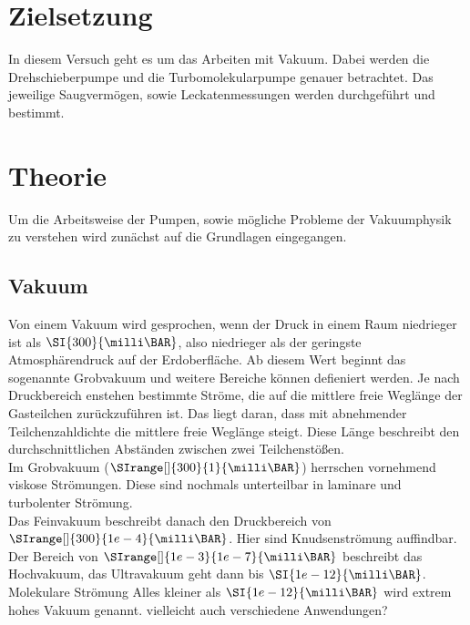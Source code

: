 \section{Zielsetzung}
    In diesem Versuch geht es um das Arbeiten mit Vakuum.
    Dabei werden die Drehschieberpumpe und die Turbomolekularpumpe genauer betrachtet.
    Das jeweilige Saugvermögen, sowie Leckatenmessungen werden durchgeführt und bestimmt.

\section{Theorie}
\label{sec:Theorie}
    Um die Arbeitsweise der Pumpen, sowie mögliche Probleme der Vakuumphysik zu verstehen wird zunächst auf die Grundlagen eingegangen.
    \subsection{Vakuum}
        Von einem Vakuum wird gesprochen, wenn der Druck in einem Raum niedrieger ist als $\SI{300}{\milli\BAR}$, also niedrieger als der geringste Atmosphärendruck auf der Erdoberfläche.
        Ab diesem Wert beginnt das sogenannte Grobvakuum und weitere Bereiche können defieniert werden.
        Je nach Druckbereich enstehen bestimmte Ströme, die auf die mittlere freie Weglänge der Gasteilchen zurückzuführen ist.
        Das liegt daran, dass mit abnehmender Teilchenzahldichte die mittlere freie Weglänge steigt.
        Diese Länge beschreibt den durchschnittlichen Abständen zwischen zwei Teilchenstößen. \\
        \noindent
        Im Grobvakuum ($\SIrange[]{300}{1}{\milli\BAR}$) herrschen vornehmend viskose Strömungen.
        Diese sind nochmals unterteilbar in laminare und turbolenter Strömung.\\
        \noindent
        Das Feinvakuum beschreibt danach den Druckbereich von $\SIrange[]{300}{1e-4}{\milli\BAR}$.
        Hier sind Knudsenströmung auffindbar.
        \noindent
        Der Bereich von $\SIrange[]{1e-3}{1e-7}{\milli\BAR}$ beschreibt das Hochvakuum, das Ultravakuum geht dann bis $\SI{1e-12}{\milli\BAR}$.
        Molekulare Strömung
        \noindent
        Alles kleiner als $\SI{1e-12}{\milli\BAR}$ wird extrem hohes Vakuum genannt.
        vielleicht auch verschiedene Anwendungen?


